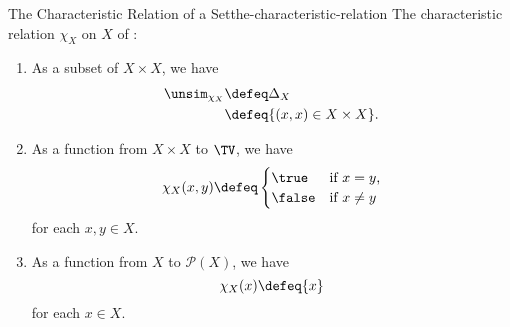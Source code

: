 \begin{example}{The Characteristic Relation of a Set}{the-characteristic-relation}%
    The characteristic relation $\chi_{X}$ on $X$ of :
    \begin{enumerate}
        \item\label{the-characteristic-relation-1}As a subset of $X\times X$, we have
            \begin{align*}
                \unsim_{\chi_{X}} &\defeq \Delta_{X}\\%
                                  &\defeq \{(x,x)\in X\times X\}.%
            \end{align*}
        \item\label{the-characteristic-relation-2}As a function from $X\times X$ to $\TV$, we have
            \[
                \chi_{X}(x,y)
                \defeq
                \begin{cases}
                    \true  &\text{if $x=y$,}\\
                    \false &\text{if $x\neq y$}
                \end{cases}
            \]%
            for each $x,y\in X$.
        \item\label{the-characteristic-relation-3}As a function from $X$ to $\mathcal{P}(X)$, we have
            \[%
                \chi_{X}(x)%
                \defeq%
                \{x\}%
            \]%
            for each $x\in X$.
    \end{enumerate}
\end{example}
